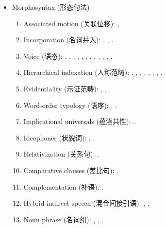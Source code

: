 \documentclass[oneside,a4paper,11pt]{article}
\newcommand{\zh}[1]{{\cn #1}}
\newcommand{\lingua}[3]{#1 (\zh{#3})}
\begin{document}
\begin{itemize}
\begin{itemize}
\item \lingua{Morphosyntax}{Morphosyntaxe}{形态句法}
\begin{enumerate}
\item \lingua{Associated motion}{Mouvement associé}{关联位移}:
\cite{jacques13harmonization}, \cite{fuente18am}
\item  \lingua{Incorporation}{Incorporation}{名词并入}: \cite{jacques11tangut.verb}, \cite{jacques12demotion}, \cite{jacques12incorp}.
\item  \lingua{Voice}{Voix}{语态}:  \cite{jacques07passif}, \cite{jacques10refl}, \cite{jacques12demotion}, \cite{jacques13derivational.khaling}, \cite{jacques13tropative}, \cite{jacques14antipassive}, \cite{jacques15derivational.khaling}, \cite{jacques15causative},  \cite{jacques15spontaneous},  \cite{jacques16si}, \cite{jacques18generic}, \cite{jacques17volitional}.
\item \lingua{Hierarchical indexation}{Indexation hiérarchique}{人称范畴}:  \cite{jacques10inverse},     \cite{jacques12khaling},   \cite{antonov14rtau}, \cite{jacques14inverse}, \cite{jacques14rtau}, \cite{jacques16th}, \cite{jacques17stau}, \cite{jacques18generic}.
\item \lingua{Evidentiality}{Evidentialité}{示证范畴}: \cite{jacques14auditory}, \cite{jacques18nonpropositional}, \cite{jacques19egophoric}.
\item \lingua{Word-order typology}{Typologie de l'ordre des mots}{语序}: \cite{jacques13harmonization}, \cite{grossmann18adverbial}.
\item \lingua{Implicational universals}{Universels implicationnels}{蕴涵共性}: \cite{antonov14need}.
\item \lingua{Ideophones}{Idéophones}{状貌词}: \cite{japhug14ideophones}, \cite{jacques18ipa}.
\item \lingua{Relativization}{Relatives}{关系句}: \cite{jacques16relatives}.
\item \lingua{Comparative clauses}{Comparatives}{差比句}: \cite{jacques16comparative}.
\item \lingua{Complementation}{Complétives}{补语}: \cite{jacques16complementation}.
\item \lingua{Hybrid indirect speech}{Discours indirect hybride}{混合间接引语}: \cite{jacques16complementation}, \cite{jacques17stau}.
\item \lingua{Noun phrase}{Syntagmes nominaux}{名词组}: \cite{jacques17num}, \cite{jacques17sketch}, \cite{jacques17comitative}.
\end{enumerate}


\end{itemize}
\end{itemize}
\end{document}
